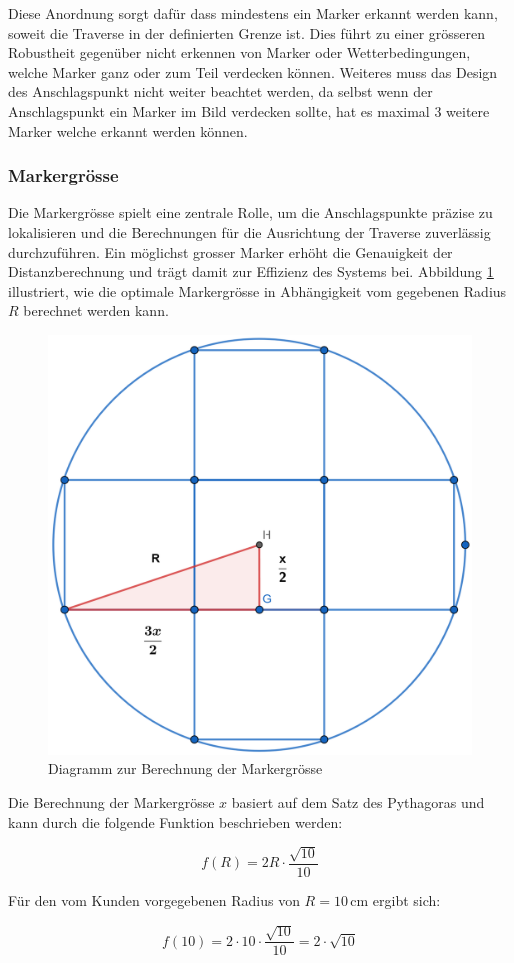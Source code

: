 Diese Anordnung sorgt dafür dass mindestens ein Marker erkannt werden kann, soweit die Traverse in der definierten Grenze ist. 
Dies führt zu einer grösseren Robustheit gegenüber nicht erkennen von Marker oder Wetterbedingungen, welche Marker ganz oder zum Teil verdecken können.
Weiteres muss das Design des Anschlagspunkt nicht weiter beachtet werden, da selbst wenn der Anschlagspunkt ein Marker im Bild verdecken sollte, hat es maximal 3 weitere Marker welche erkannt werden können.
\clearpage
\subsubsection{Markergrösse}

Die Markergrösse spielt eine zentrale Rolle, um die Anschlagspunkte präzise zu lokalisieren und 
die Berechnungen für die Ausrichtung der Traverse zuverlässig durchzuführen. Ein möglichst grosser 
Marker erhöht die Genauigkeit der Distanzberechnung und trägt damit zur Effizienz des Systems bei. 
Abbildung \ref{fig:marker} illustriert, wie die optimale Markergrösse in Abhängigkeit vom gegebenen 
Radius \( R \) berechnet werden kann.

\begin{figure}[H]
    \centering
    \includegraphics[width=0.5\linewidth]{graphics/marker.png}
    \caption{Diagramm zur Berechnung der Markergrösse}
    \label{fig:marker}
\end{figure}

Die Berechnung der Markergrösse \( x \) basiert auf dem Satz des Pythagoras und kann durch die folgende Funktion beschrieben werden:

\[
f(R) = 2R \cdot \frac{\sqrt{10}}{10}
\]

Für den vom Kunden vorgegebenen Radius von \( R = 10 \, \mathrm{cm} \) ergibt sich:

\[
f(10) = 2 \cdot 10 \cdot \frac{\sqrt{10}}{10} = 2 \cdot \sqrt{10}
\]

